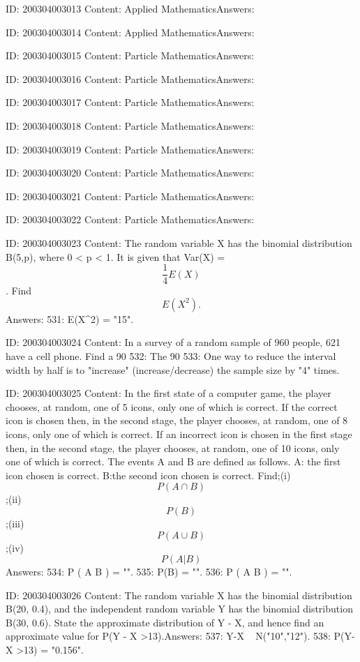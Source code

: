 \documentclass{article}
\begin{document}
ID: 200304003013
Content:
Applied MathematicsAnswers:

ID: 200304003014
Content:
Applied MathematicsAnswers:

ID: 200304003015
Content:
Particle MathematicsAnswers:

ID: 200304003016
Content:
Particle MathematicsAnswers:

ID: 200304003017
Content:
Particle MathematicsAnswers:

ID: 200304003018
Content:
Particle MathematicsAnswers:

ID: 200304003019
Content:
Particle MathematicsAnswers:

ID: 200304003020
Content:
Particle MathematicsAnswers:

ID: 200304003021
Content:
Particle MathematicsAnswers:

ID: 200304003022
Content:
Particle MathematicsAnswers:

ID: 200304003023
Content:
The random variable X has the binomial distribution B(5,p), where 0 < p < 1. It is given that Var(X) = $$\frac{1}{4}E(X)$$. Find $$E(X^2).$$Answers:
531: E(X^2) = "15".

ID: 200304003024
Content:
In a survey of a random sample of 960 people, 621 have a cell phone. Find a 90%
532: The 90%
533: One way to reduce the interval width by half is to "increase" (increase/decrease) the sample size by "4" times.

ID: 200304003025
Content:
In the first state of a computer game, the player chooses, at random, one of 5 icons, only one of which is correct. If the correct icon is chosen then, in the second stage, the player chooses, at random, one of 8 icons, only one of which is correct. If an incorrect icon is chosen in the first stage then, in the second stage, the player chooses, at random, one of 10 icons, only one of which is correct. The events A and B are defined as follows. A: the first icon chosen is correct. B:the second icon chosen is correct. Find;(i) $$P(A \cap B)$$;(ii) $$P(B)$$;(iii) $$P(A \cup B)$$;(iv) $$P(A|B)$$Answers:
534: P ( A \cap B )  = "".
535: P(B) = "".
536: P ( A \cup B )  = "".

ID: 200304003026
Content:
The random variable X has the binomial distribution B(20, 0.4), and the independent random variable Y has the binomial distribution B(30, 0.6). State the approximate distribution of Y - X, and hence find an approximate value for P(Y - X >13).Answers:
537: Y-X ~ N("10","12").
538: P(Y-X >13) = "0.156".
\end{document}
